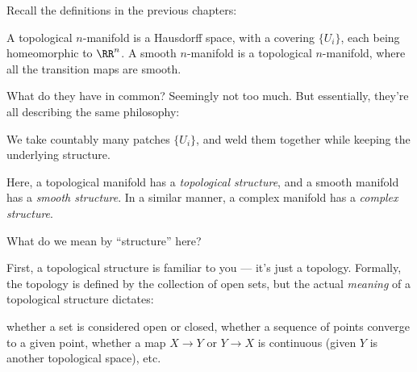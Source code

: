 Recall the definitions in the previous chapters:
\begin{itemize}
	\ii A topological $n$-manifold is a Hausdorff space, with a covering $\{ U_i \}$, each being
	homeomorphic to $\RR^n$.
	\ii A smooth $n$-manifold is a topological $n$-manifold, where all the transition maps are
	smooth.
\end{itemize}
What do they have in common? Seemingly not too much. But essentially, they're all describing the
same philosophy:
\begin{moral}
	We take countably many patches $\{ U_i \}$, and weld them together while keeping the underlying
	structure.
\end{moral}

Here, a topological manifold has a \emph{topological structure}, and a smooth manifold has a
\emph{smooth structure}. In a similar manner, a complex manifold has a \emph{complex structure}.

What do we mean by ``structure'' here?

First, a topological structure is familiar to you --- it's just a topology.
Formally, the topology is defined by the collection of open sets, but the actual \emph{meaning} of a
topological structure dictates:
\begin{itemize}
	\ii whether a set is considered open or closed,
	\ii whether a sequence of points converge to a given point,
	\ii whether a map $X \to Y$ or $Y \to X$ is continuous (given $Y$ is another topological space),
	\ii etc.
\end{itemize}

